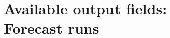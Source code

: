 \documentclass[a4paper,twoside,10pt]{book}
\begin{document}
\chapter[Available output fields: Forecast runs]{Available output fields:\\ Forecast runs}






\begin{appendices}
%
\end{appendices}



\backmatter

\renewcommand{\chaptermark}[1] {
  \markboth{#1}{}
}

\renewcommand{\chaptermark}[1]{%
  \markboth{\chaptername
    \ \thechapter.\ #1}{}}
\end{document}
